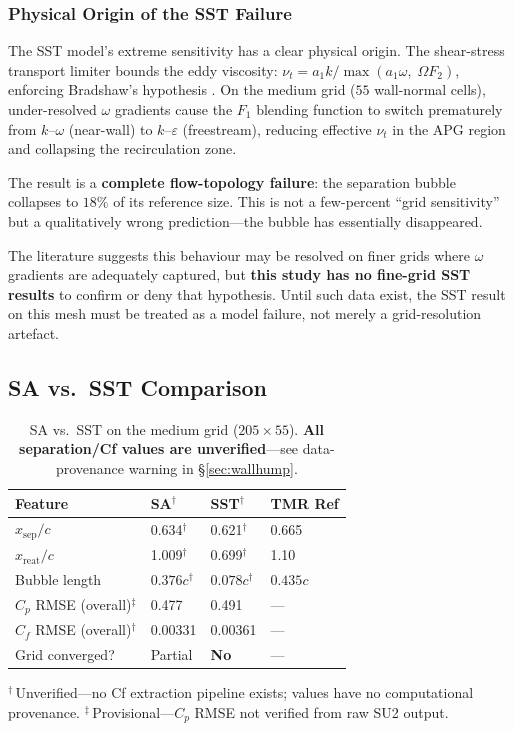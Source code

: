 \documentclass[11pt,a4paper]{article}
\begin{document}
\subsubsection{Physical Origin of the SST Failure}

The SST model's extreme sensitivity has a clear physical origin.  The
shear-stress transport limiter bounds the eddy viscosity:
$\nu_t = a_1 k / \max(a_1\omega,\;\Omega F_2)$, enforcing Bradshaw's
hypothesis \cite{Bradshaw1967}.  On the medium grid ($55$ wall-normal
cells), under-resolved $\omega$ gradients cause the $F_1$ blending
function to switch prematurely from $k$--$\omega$ (near-wall) to
$k$--$\varepsilon$ (freestream), reducing effective $\nu_t$ in the APG
region and collapsing the recirculation zone.

The result is a \textbf{complete flow-topology failure}: the
separation bubble collapses to $18\%$ of its reference size.  This is
not a few-percent ``grid sensitivity'' but a qualitatively wrong
prediction---the bubble has essentially disappeared.

The literature \cite{Menter1994, Wilcox2006} suggests this behaviour
may be resolved on finer grids where $\omega$ gradients are adequately
captured, but \textbf{this study has no fine-grid SST results} to
confirm or deny that hypothesis.  Until such data exist, the SST
result on this mesh must be treated as a model failure, not merely a
grid-resolution artefact.

\subsection{SA vs.\ SST Comparison}

\begin{table}[!ht]
\centering
\caption{SA vs.\ SST on the medium grid ($205\times55$).%
  \newline\textbf{All separation/Cf values are unverified}---see
  data-provenance warning in \S\ref{sec:wallhump}.}
\label{tab:sa_sst}
\begin{tabular}{llll}
\toprule
\textbf{Feature} & \textbf{SA$^\dagger$} & \textbf{SST$^\dagger$} & \textbf{TMR Ref} \\
\midrule
$x_\text{sep}/c$       & 0.634$^\dagger$    & 0.621$^\dagger$    & 0.665   \\
$x_\text{reat}/c$      & 1.009$^\dagger$    & 0.699$^\dagger$    & 1.10    \\
Bubble length           & $0.376c^\dagger$ & $0.078c^\dagger$ & $0.435c$ \\
$C_p$ RMSE (overall)$^\ddagger$    & 0.477    & 0.491    & ---     \\
$C_f$ RMSE (overall)$^\dagger$    & 0.00331  & 0.00361  & ---     \\
Grid converged?         & Partial  & \textbf{No} & ---  \\
\bottomrule
\end{tabular}

\medskip\footnotesize $^\dagger$\,Unverified---no Cf extraction
pipeline exists; values have no computational provenance.
$^\ddagger$\,Provisional---$C_p$ RMSE not verified from raw SU2 output.
\end{table}
\end{document}
